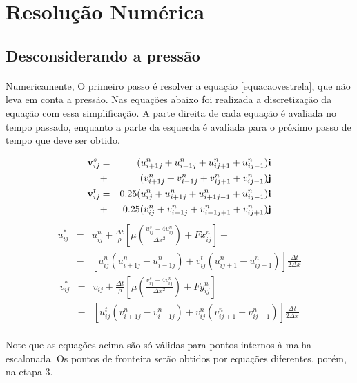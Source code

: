\documentclass[poisson.tex]{subfiles}
\begin{document}
\section{Resolução Numérica}
\subsection{Desconsiderando a pressão}
\paragraph{} Numericamente, O primeiro passo é resolver a equação \ref{equacaovestrela}, que não leva em conta a pressão. Nas equações abaixo foi realizada a discretização da equação com essa simplificação. A parte direita de cada equação é avaliada no tempo passado, enquanto a parte da esquerda é avaliada para o próximo passo de tempo que deve ser obtido.

\begin{eqnarray}
\textbf{v}_{ij}^s&=&({u}_{i+1j}^n+{u}_{i-1j}^n+{u}_{ij+1}^n+{u}_{ij-1}^n)\textbf{i} \nonumber \\&+& ({v}_{i+1j}^n+{v}_{i-1j}^n+{v}_{ij+1}^n+{v}_{ij-1}^n)\textbf{j}\\
\textbf{v}_{ij}^t&=&0.25(u_{ij}^n+u_{i+1j}^n+u_{i+1j-1}^n+u_{ij-1}^n)\textbf{i} \nonumber \\ &+& 0.25(v_{ij}^n+v_{i-1j}^n+v_{i-1j+1}^n+v_{ij+1}^n)\textbf{j}
\end{eqnarray}
\begin{eqnarray}
u_{ij}^{*}&=&u_{ij}^n+\frac{\Delta t}{\rho}\left[\mu\left(\frac{u_{ij}^s-4u_{ij}^n}{\Delta
x^2}\right)+Fx_{ij}^n\right] + \nonumber \\
&-&\left[u_{ij}^n(u_{i+1j}^n-u_{i-1j}^n)+v_{ij}^t(u_{ij+1}^n-u_{ij-1}^n)\right]\frac{\Delta t}{2\Delta x}
\end{eqnarray}
\begin{eqnarray}
v_{ij}^{*}&=&v_{ij}+\frac{\Delta t}{\rho}\left[\mu\left(\frac{v_{ij}^s-4v_{ij}^n}{\Delta
x^2}\right)+Fy_{ij}^n\right] \nonumber \\
&-&\left[u_{ij}^t (v_{i+1j}^n-v_{i-1j}^n)+v_{ij}^n(v_{ij+1}^n-v_{ij-1}^n)\right]\frac{\Delta t}{2\Delta x}
\end{eqnarray}

\paragraph{} Note que as equações acima são só válidas para pontos internos à malha escalonada. Os pontos de fronteira serão obtidos por equações diferentes, porém, na etapa 3. 
\end{document}
